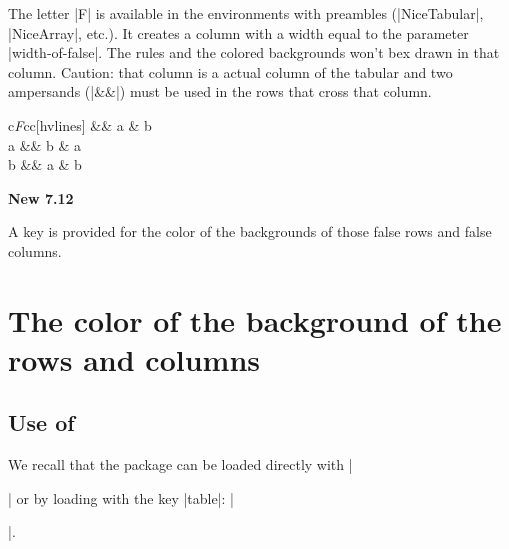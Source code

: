 \documentclass[dvipsnames]{article}
\begin{document}
\smallskip
The letter |F| is available in the environments with preambles (|{NiceTabular}|,
|{NiceArray}|, etc.). It creates a column with a width equal to the parameter
|width-of-false|. The rules and the colored backgrounds won't bex
drawn in that column. Caution: that column is a actual column of the tabular
and two ampersands (|&&|) must be used in the rows that cross that column.

\medskip
\begin{Code}[width=10cm,show-output]
\begin{NiceTabular}{c\emph{F}cc}[hvlines]
\CodeBefore
\Body
{} && a & b \\
\emph{\FalseRow}
a              && b & a \\
b              && a & b
\end{NiceTabular}
\end{Code}

\bigskip
{}
\colorbox{yellow!50}{\textbf{New 7.12}}

\nobreak
\smallskip
A key  is provided for the color of the backgrounds of
those false rows and false columns.



\section{The color of the background of the rows and columns}


\subsection{Use of \texorpdfstring{}{colortbl}}


We recall that the package  can be loaded directly with
|\usepackage{colortbl}| or by loading  with the key |table|:
|\usepackage[table]{xcolor}|. 
\end{document}

